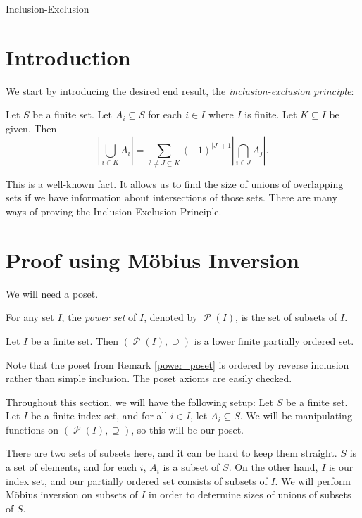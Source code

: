 \documentclass[12pt]{pom_thesis}
\DeclareMathOperator{\ps}{\mathscr{P}}
\begin{document}
\begin{chapter}{Inclusion-Exclusion}
\section{Introduction}
We start by introducing the desired end result, the \emph{inclusion-exclusion principle}:
\begin{thm}\label{iep}
Let $S$ be a finite set. Let $A_i \subseteq S$ for each $i \in I$ where $I$ is finite. Let $K \subseteq I$ be given. Then
\[
\left|\bigcup_{i \in K}A_i\right| = \sum_{\emptyset \neq J \subseteq K}(-1)^{|J| + 1}\left|\bigcap_{i \in J}A_j\right|
.\]
\end{thm}
This is a well-known fact. It allows us to find the size of unions of overlapping sets if we have information about intersections of those sets. There are many ways of proving the Inclusion-Exclusion Principle. %

\section{Proof using M\"obius Inversion} 
We will need a poset.

\begin{defn}
For any set $I$, the \emph{power set} of $I$, denoted by $\ps(I)$, is the set of subsets of $I$. 
\end{defn}
\begin{rmk}\label{power_poset}
Let $I$ be a finite set. Then $(\ps(I), \supseteq)$ is a lower finite partially ordered set.
\end{rmk}
Note that the poset from Remark \ref{power_poset} is ordered by reverse inclusion rather than simple inclusion. The poset axioms are easily checked.

Throughout this section, we will have the following setup: Let $S$ be a finite set. Let $I$ be a finite index set, and for all $i \in I$, let $A_i \subseteq S$. We will be manipulating functions on $(\ps(I), \supseteq)$, so this will be our poset. 

There are two sets of subsets here, and it can be hard to keep them straight. $S$ is a set of elements, and for each $i$, $A_i$ is a subset of $S$. On the other hand, $I$ is our index set, and our partially ordered set consists of subsets of $I$. We will perform M\"obius inversion on subsets of $I$ in order to determine sizes of unions of subsets of $S$.


\end{chapter}
\end{document}
